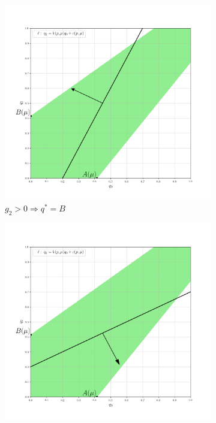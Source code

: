\begin{flushleft}
	\begin{figure}[H]
    	\centering
     	\begin{subfigure}[b]{0.3 \textwidth}
        	\centering
        	\includegraphics[width=\textwidth]{images/graf_3_8_1}
        	\caption{$g_2 > 0 \Rightarrow q^*=B$}
     	\end{subfigure}
     	\begin{subfigure}[b]{0.3 \textwidth}
        	\centering
        	\includegraphics[width=\textwidth]{images/graf_3_8_2}

\end{subfigure}
\end{figure}
\end{flushleft}
